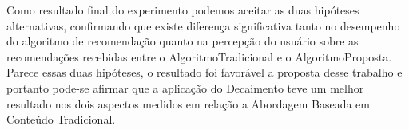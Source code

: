 Como resultado final do experimento podemos aceitar as duas hipóteses alternativas, confirmando que existe diferença significativa
tanto no desempenho do algoritmo de recomendação quanto na percepção do usuário sobre as recomendações recebidas
entre o AlgoritmoTradicional e o AlgoritmoProposta. Parece essas duas hipóteses, o resultado foi favorável a proposta desse trabalho
e portanto pode-se afirmar que a aplicação do Decaimento teve um melhor resultado nos dois aspectos medidos em relação
a Abordagem Baseada em Conteúdo Tradicional.
